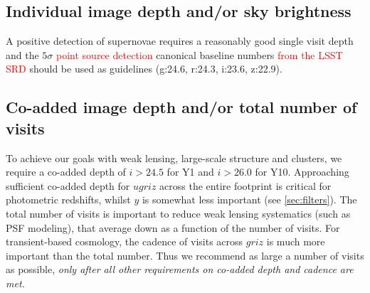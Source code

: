 \documentclass[12pt, letterpaper]{article}
\newcommand{\review}[1]{{\textcolor{red}{#1}}}
\begin{document}
\subsection{Individual image depth and/or sky brightness}
A positive detection of supernovae requires a reasonably good single visit depth and the $5\sigma$ \review{point source detection} canonical baseline numbers \review{from the LSST SRD \cite{lsstSRD}} should be used as guidelines (g:24.6, r:24.3, i:23.6, z:22.9). %

\subsection{Co-added image depth and/or total number of visits}
To achieve our goals with weak lensing, large-scale structure and clusters, we require a co-added depth of $i>24.5$ for Y1 and $i>26.0$ for Y10. 
Approaching 
sufficient co-added depth for $ugriz$ across the entire footprint is critical for photometric redshifts, whilst  $y$  is somewhat less important (see \autoref{sec:filters}). The total number of visits is important to reduce weak lensing systematics (such as PSF modeling), that
average down as a function of the number of visits. For transient-based cosmology, the cadence of visits across $griz$ is much more important than the total number. Thus we recommend as large a number of visits as possible, \emph{only after all other requirements on co-added depth and cadence are met.}
\end{document}
